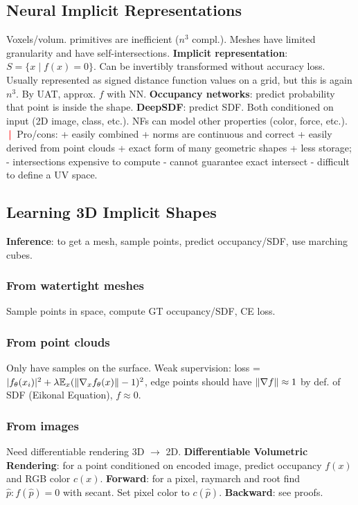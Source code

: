 \documentclass[11pt,landscape,a4paper,fleqn]{article}
\newcommand{\E}{\mathbb{E}}
\newcommand{\sep}{\,\textcolor{red}{\bm|}\,}
\begin{document}
\begin{multicols*}{4}
\section{Neural Implicit Representations}

Voxels/volum. primitives are inefficient ($n^3$ compl.).
Meshes have limited granularity and have self-intersections.
\textbf{Implicit representation}: $S = \{x \mid f(x) = 0\}$.
Can be invertibly transformed without accuracy loss.
Usually represented as signed distance function values on a grid, but this is again $n^3$.
By UAT, approx. $f$ with NN.
\textbf{Occupancy networks}: predict probability that point is inside the shape.
\textbf{DeepSDF}: predict SDF.
Both conditioned on input (2D image, class, etc.).
NFs can model other properties (color, force, etc.).
$\sep$ Pro/cons: + easily combined + norms are continuous and correct + easily derived from point clouds + exact form of many geometric shapes + less storage; - intersections expensive to compute - cannot guarantee exact intersect - difficult to define a UV space.

\subsection{Learning 3D Implicit Shapes}

\textbf{Inference}: to get a mesh, sample points, predict occupancy/SDF, use marching cubes.

\subsubsection{From watertight meshes}
Sample points in space, compute GT occupancy/SDF, CE loss.

\subsubsection{From point clouds} Only have samples on the surface.
Weak supervision: loss = $|f_\theta(x_i)|^2 + \lambda \E_x(\norm{\nabla_x f_\theta(x)} - 1)^2$,
edge points should have $\norm{\nabla f} \approx 1$ by def. of SDF (Eikonal Equation), $f \approx 0$.

\subsubsection{From images} Need differentiable rendering 3D $\to$ 2D.
\textbf{Differentiable Volumetric Rendering}: for a point conditioned on encoded image,
predict occupancy $f(x)$ and RGB color $c(x)$.
\textbf{Forward}: for a pixel, raymarch and root find $\hat{p} : f(\hat{p}) = 0$ with secant. Set pixel color to $c(\hat{p})$.
\textbf{Backward}: see proofs.


\end{multicols*}
\end{document}
